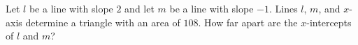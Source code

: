 Let $l$ be a line with slope $2$ and let $m$ be a line with slope $-1$. Lines $l$, $m$, and $x$-axis determine a triangle with an area of $108$. How far apart are the $x$-intercepts of $l$ and $m$?
